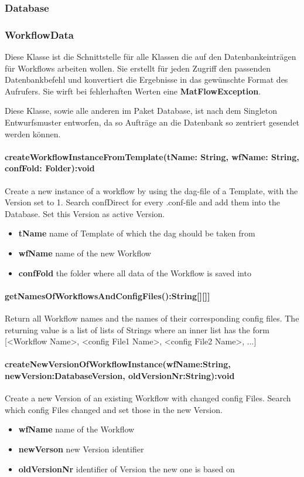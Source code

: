\subsubsection{Database}

\subsubsection{WorkflowData}
Diese Klasse ist die Schnittstelle für alle Klassen die auf den Datenbankeinträgen für Workflows arbeiten wollen. Sie erstellt für jeden Zugriff den passenden Datenbankbefehl und konvertiert die Ergebnisse in das gewünschte Format des Aufrufers.
Sie wirft bei fehlerhaften Werten eine \textbf{MatFlowException}.

Diese Klasse, sowie alle anderen im Paket Database, ist nach dem Singleton Entwurfsmuster entworfen, da so Aufträge an die Datenbank so zentriert gesendet werden können.

\paragraph{createWorkflowInstanceFromTemplate(tName: String, wfName: String, confFold: Folder):void}
Create a new instance of a workflow by using the dag-file of a Template, 
with the Version set to 1. 
Search confDirect for every .conf-file and add them into the Database.
Set this Version as active Version.
\begin{itemize}
	\item \textbf{tName}
	name of Template of which the dag should be taken from
	\item \textbf{wfName}
	name of the new Workflow
	\item \textbf{confFold}
	the folder where all data of the Workflow is saved into
\end{itemize}


\paragraph{getNamesOfWorkflowsAndConfigFiles():String[][]]}
Return all Workflow names and the names of their corresponding config files.
The returning value is a list of lists of Strings where an inner list has the form [<Workflow Name>, <config File1 Name>, <config File2 Name>, ...]

\paragraph{createNewVersionOfWorkflowInstance(wfName:String, newVersion:DatabaseVersion, oldVersionNr:String):void}
Create a new Version of an existing Workflow with changed config Files.
Search which config Files changed and set those in the new Version.
\begin{itemize}
	\item \textbf{wfName}
	name of the Workflow
	\item \textbf{newVerson}
	new Version identifier
	\item \textbf{oldVersionNr}
	identifier of Version the new one is based on
\end{itemize}

